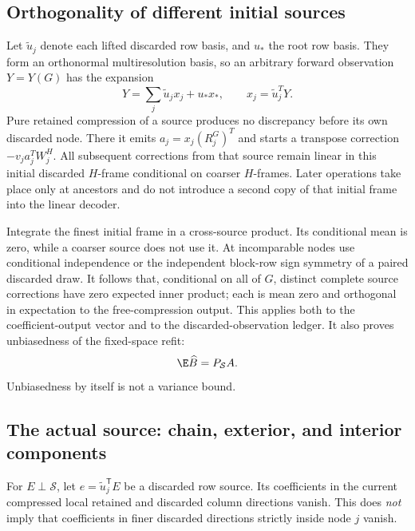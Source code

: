 \documentclass[11pt,oneside,openany,a4paper]{book}
\numberwithin{equation}{chapter}
\theoremstyle{definition}
\theoremstyle{remark}
\newcommand{\T}{\mathsf T}\newcommand{\Id}{I}
\begin{document}
\subsection{Orthogonality of different initial sources}
Let $\widetilde u_j$ denote each lifted discarded row basis, and $u_*$ the root row basis. They form an orthonormal multiresolution basis, so an arbitrary forward observation $Y=Y(G)$ has the expansion
\[
 Y=\sum_j\widetilde u_jx_j+u_*x_*,\qquad x_j=\widetilde u_j^TY.
\]
Pure retained compression of a source produces no discrepancy before its own discarded node. There it emits $a_j=x_j(R_j^G)^T$ and starts a transpose correction $-v_ja_j^TW_j^H$. All subsequent corrections from that source remain linear in this initial discarded $H$-frame conditional on coarser $H$-frames. Later operations take place only at ancestors and do not introduce a second copy of that initial frame into the linear decoder.

Integrate the finest initial frame in a cross-source product. Its conditional mean is zero, while a coarser source does not use it. At incomparable nodes use conditional independence or the independent block-row sign symmetry of a paired discarded draw. It follows that, conditional on all of $G$, distinct complete source corrections have zero expected inner product; each is mean zero and orthogonal in expectation to the free-compression output. This applies both to the coefficient-output vector and to the discarded-observation ledger. It also proves unbiasedness of the fixed-space refit:
\begin{equation}\label{base:new:unbiased}
 \E\widehat B=P_{\mathcal S}A.
\end{equation}
Unbiasedness by itself is not a variance bound.

\subsection{The actual source: chain, exterior, and interior components}
For $E\perp\mathcal S$, let $e=\widetilde u_j^\T E$ be a discarded row source. Its coefficients in the current compressed local retained and discarded column directions vanish. This does \emph{not} imply that coefficients in finer discarded directions strictly inside node $j$ vanish.
\end{document}
